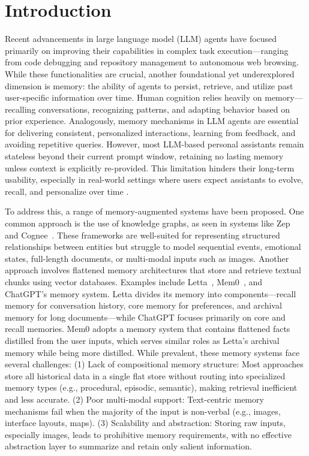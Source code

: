 \section{Introduction}
Recent advancements in large language model (LLM) agents have focused primarily on improving their capabilities in complex task execution—ranging from code debugging and repository management to autonomous web browsing. While these functionalities are crucial, another foundational yet underexplored dimension is memory: the ability of agents to persist, retrieve, and utilize past user-specific information over time. Human cognition relies heavily on memory—recalling conversations, recognizing patterns, and adapting behavior based on prior experience. Analogously, memory mechanisms in LLM agents are essential for delivering consistent, personalized interactions, learning from feedback, and avoiding repetitive queries.
However, most LLM-based personal assistants remain stateless beyond their current prompt window, retaining no lasting memory unless context is explicitly re-provided. This limitation hinders their long-term usability, especially in real-world settings where users expect assistants to evolve, recall, and personalize over time \cite{lscs}.

To address this, a range of memory-augmented systems have been proposed. One common approach is the use of knowledge graphs, as seen in systems like Zep~\citep{zep} and Cognee~\citep{cognee}. These frameworks are well-suited for representing structured relationships between entities but struggle to model sequential events, emotional states, full-length documents, or multi-modal inputs such as images. Another approach involves flattened memory architectures that store and retrieve textual chunks using vector databases. Examples include Letta~\citep{memgpt}, Mem0~\citep{mem0}, and ChatGPT’s memory system. Letta divides its memory into components—recall memory for conversation history, core memory for preferences, and archival memory for long documents—while ChatGPT focuses primarily on core and recall memories. Mem0 adopts a memory system that contains flattened facts distilled from the user inputs, which serves similar roles as Letta's archival memory while being more distilled. While prevalent, these memory systems face several challenges: (1) Lack of compositional memory structure: Most approaches store all historical data in a single flat store without routing into specialized memory types (e.g., procedural, episodic, semantic), making retrieval inefficient and less accurate. (2) Poor multi-modal support: Text-centric memory mechanisms fail when the majority of the input is non-verbal (e.g., images, interface layouts, maps). (3) Scalability and abstraction: Storing raw inputs, especially images, leads to prohibitive memory requirements, with no effective abstraction layer to summarize and retain only salient information. 

